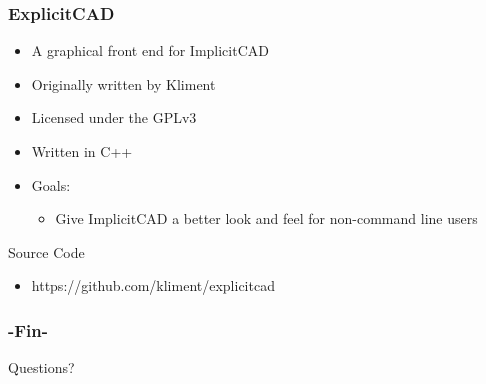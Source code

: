\documentclass{beamer}
\begin{document}
\begin{frame}
  \frametitle{ExplicitCAD}
\begin{itemize}
\item A graphical front end for ImplicitCAD
\item Originally written by Kliment
\item Licensed under the GPLv3
\item Written in C++
\item Goals:
  \begin{itemize}
  \item Give ImplicitCAD a better look and feel for non-command line users
  \end{itemize}
\end{itemize}
\begin{block}{Source Code}
\begin{itemize}
\item https://github.com/kliment/explicitcad
\end{itemize}
\end{block}
\end{frame}

\begin{frame}
\frametitle{-Fin-}
\Huge{\centerline{Questions?}}
\end{frame}

\end{document}

